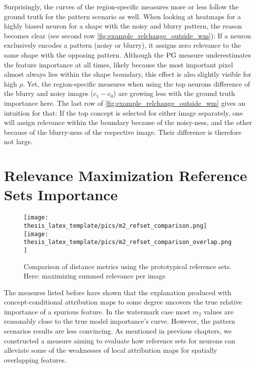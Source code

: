Surprisingly, the curves of the region-specific measures more or less follow the ground truth for the pattern scenario as well. When looking at heatmaps for a highly biased neuron for a shape with the noisy and blurry pattern, the reason becomes clear (see second row \cref{fig:example_relchange_outside_wm}): If a neuron exclusively encodes a pattern (noisy or blurry), it assigns zero relevance to the same shape with the opposing pattern. Although the $\operatorname*{PG}$ measure underestimates the feature importance at all times, likely because the most important pixel almost always lies within the shape boundary, this effect is also slightly visible for high $\rho$. 
Yet, the region-specific measures when using the top neurons difference of the blurry and noisy images ($c_1- c_0$)  are growing less with the ground truth importance here. The last row of \cref{fig:example_relchange_outside_wm} gives an intuition for that: If the top concept is selected for either image separately, one will assign relevance within the boundary because of the noisy-ness, and the other because of the blurry-ness of the respective image. Their difference is therefore not large. 

\section{Relevance Maximization Reference Sets Importance}
\begin{figure}[ht!]
    \centering
    \texttt{[image: thesis\_latex\_template/pics/m2\_refset\_comparison.png]}
    \texttt{[image: thesis\_latex\_template/pics/m2\_refset\_comparison\_overlap.png]}
    \caption[Reference Sets, Comparison of Metrics ]{Comparison of distance metrics using the prototypical reference sets. Here: maximizing summed relevance per image }
    \label{fig:m2_refset_relevance}
\end{figure}
The measures listed before have shown that the explanation produced with concept-conditional attribution maps to some degree uncovers the true relative importance of a spurious feature.
In the watermark case most $m_2$ values are reasonably close to the true model importance's curve.
However, the pattern scenarios results are less convincing. As mentioned in previous chapters, we constructed a measure aiming to evaluate how reference sets for neurons can alleviate some of the weaknesses of local attribution maps for spatially overlapping features. 

